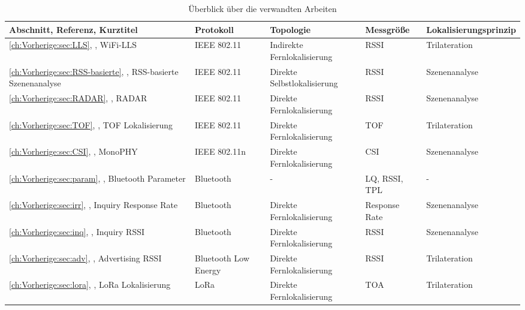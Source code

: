 \begin{table}[h!]
	\centering
	\caption{Überblick über die verwandten Arbeiten}
	\label{table:verwandte}
	\begin{tabular}{p{3.7cm}|p{1.7cm}|p{2cm}|p{2cm}|p{2.3cm}}
		Abschnitt, Referenz, Kurztitel & Protokoll & Topologie & Messgröße & Lokalisier\-ungsprinzip\\
		\hline
		\ref{ch:Vorherige:sec:LLS}, \cite{chen2007design}, WiFi-LLS & IEEE 802.11 & Indirekte Fernlokalisierung & RSSI & Trilateration \\
		\hline
		\ref{ch:Vorherige:sec:RSS-basierte}, \cite{prasithsangaree2002indoor}, RSS-basierte Szenenanalyse & IEEE 802.11 & Direkte Selbstlokalisierung & RSSI & Szenenanalyse \\
		\hline
		\ref{ch:Vorherige:sec:RADAR}, \cite{bahl2000radar}, RADAR & IEEE 802.11 & Direkte Fernlokalisierung & RSSI & Szenenanalyse \\
		\hline
		\ref{ch:Vorherige:sec:TOF}, \cite{wibowo2009time}, TOF Lokalisierung & IEEE 802.11 & Direkte Fernlokalisierung & TOF & Trilateration \\
		\hline
		\ref{ch:Vorherige:sec:CSI}, \cite{abdel2013monophy}, MonoPHY & IEEE 802.11n & Direkte Fernlokalisierung & CSI & Szenenanalyse \\
		\hline
		\ref{ch:Vorherige:sec:param}, \cite{hossain2007comprehensive}, Bluetooth Parameter & Bluetooth & - & LQ, RSSI, TPL & - \\
		\hline
		\ref{ch:Vorherige:sec:irr}, \cite{bargh2008indoor}, Inquiry Response Rate & Bluetooth & Direkte Fernlokalisierung & Response Rate & Szenenanalyse \\
		\hline
		\ref{ch:Vorherige:sec:inq}, \cite{ling2010inquiry}, Inquiry RSSI & Bluetooth & Direkte Fernlokalisierung & RSSI & Szenenanalyse \\
		\hline
		\ref{ch:Vorherige:sec:adv}, \cite{jianyong2014rssi}, Advertising RSSI & Bluetooth Low Energy & Direkte Fernlokalisierung & RSSI & Trilateration \\
		\hline
		\ref{ch:Vorherige:sec:lora}, \cite{kim2016poster}, LoRa Lokalisierung & LoRa & Direkte Fernlokalisierung & TOA & Trilateration \\
	\end{tabular}
\end{table}

